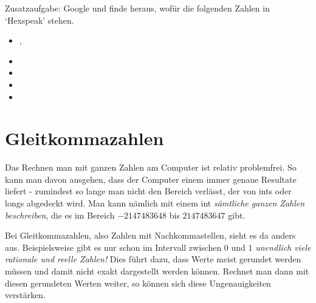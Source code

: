 \begin{question}
	Zusatzaufgabe: Google und finde heraus, wofür die folgenden Zahlen in `Hexspeak' stehen.
	\begin{itemize}
		\item {}, 
		\item {}
		\item {}
		\item {}
		\item {}
	\end{itemize}
\end{question}
\begin{solution}
\end{solution}


\newpage

\section{Gleitkommazahlen}

Das Rechnen man mit ganzen Zahlen am Computer ist relativ problemfrei. So kann man davon ausgehen, dass der Computer einem immer genaue Resultate liefert - zumindest so lange man nicht den Bereich verlässt, der von ints oder longs abgedeckt wird. Man kann nämlich mit einem int \textit{sämtliche ganzen Zahlen beschreiben}, die es im Bereich $-2147483648$ bis $2147483647$ gibt.

Bei Gleitkommazahlen, also Zahlen mit Nachkommastellen, sieht es da anders aus. Beispielsweise gibt es nur schon im Intervall zwischen $0$ und $1$ \textit{unendlich viele rationale und reelle Zahlen!} Dies führt dazu, dass Werte meist gerundet werden müssen und damit nicht exakt dargestellt werden können. Rechnet man dann mit diesen gerundeten Werten weiter, so können sich diese Ungenauigkeiten verstärken.

